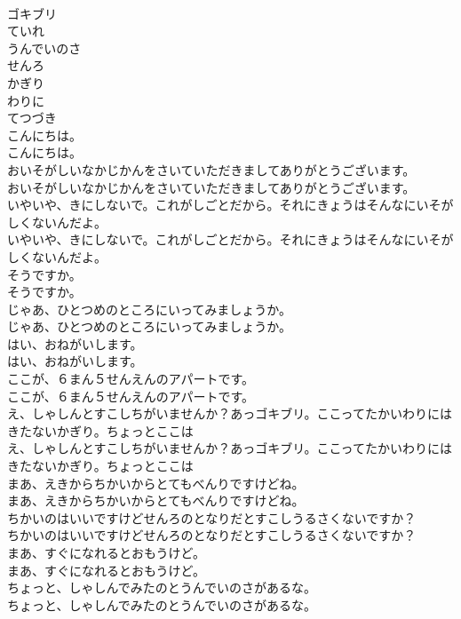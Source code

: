 \documentclass[8pt]{extreport}
\begin{document}
\begin{CJK}{UTF8}{min}
\\	ゴキブリ
\\	ていれ
\\	うんでいのさ
\\	せんろ
\\	かぎり
\\	わりに
\\	てつづき
\\	こんにちは。	
\\	こんにちは。 
\\	おいそがしいなかじかんをさいていただきましてありがとうございます。	
\\	おいそがしいなかじかんをさいていただきましてありがとうございます。 
\\	いやいや、きにしないで。これがしごとだから。それにきょうはそんなにいそがしくないんだよ。	
\\	いやいや、きにしないで。これがしごとだから。それにきょうはそんなにいそがしくないんだよ。 
\\	そうですか。	
\\	そうですか。 
\\	じゃあ、ひとつめのところにいってみましょうか。	
\\	じゃあ、ひとつめのところにいってみましょうか。 
\\	はい、おねがいします。	
\\	はい、おねがいします。 
\\	ここが、６まん５せんえんのアパートです。	
\\	ここが、６まん５せんえんのアパートです。 
\\	え、しゃしんとすこしちがいませんか？あっゴキブリ。ここってたかいわりにはきたないかぎり。ちょっとここは
\\	え、しゃしんとすこしちがいませんか？あっゴキブリ。ここってたかいわりにはきたないかぎり。ちょっとここは
\\	まあ、えきからちかいからとてもべんりですけどね。	
\\	まあ、えきからちかいからとてもべんりですけどね。 
\\	ちかいのはいいですけどせんろのとなりだとすこしうるさくないですか？	
\\	ちかいのはいいですけどせんろのとなりだとすこしうるさくないですか？ 
\\	まあ、すぐになれるとおもうけど。	
\\	まあ、すぐになれるとおもうけど。 
\\	ちょっと、しゃしんでみたのとうんでいのさがあるな。	
\\	ちょっと、しゃしんでみたのとうんでいのさがあるな。 

\end{CJK}
\end{document}

